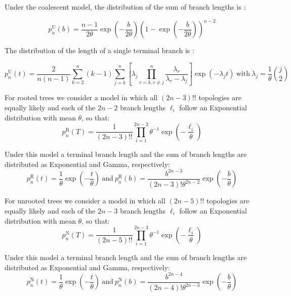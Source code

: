 \documentclass{article}
\begin{document}
Under the coalescent model, the distribution of the sum of branch lengths
is \citep{Tavare1984}: 

\begin{equation}
p_n^\mathrm{U}(b)=\frac{n-1}{2\theta}\exp\left(-\frac{b}{2\theta}\right)\left(1-\exp\left(-\frac{b}{2\theta}\right)\right)^{n-2}
\label{eq:coalescent-sumblen}
\end{equation}

The distribution of the length of a single terminal branch is \citep{caliebeLengthDistributionExternal2007}:

\begin{equation}
p_n^\mathrm{U}(t)=\frac{2}{n(n-1)}\sum_{k=2}^n (k-1) \sum_{j=k}^n \left[\lambda_j \prod_{r=k,r\neq j}^n \frac{\lambda_r}{\lambda_r-\lambda_j}\right]\exp(-\lambda_j t) \mathrm{~with~}\lambda_j=\frac{1}{\theta}{j \choose 2}
\label{eq:coalescent-blen}
\end{equation}

For rooted trees we consider a model in which all $(2n-3)!!$ topologies are equally
likely and each of the $2n-2$ branch lengths $\ell_i$ follow an Exponential distribution with mean $\theta$, so that:
\begin{equation}\label{eq:tree-distrib2}
p_n^\mathrm{R}(T)=\frac{1}{(2n-3)!!}\prod_{i=1}^{2n-2}\theta^{-1}\exp\left(-\frac{\ell_i}{\theta}\right)
\end{equation}

Under this model a terminal branch length and the sum of branch lengths are distributed as
Exponential and Gamma, respectively:
\begin{equation}
p_n^\mathrm{R}(t)=\frac{1}{\theta}\exp\left( -\frac{t}{\theta} \right)
\mathrm{~and~}
p_n^\mathrm{R}(b)=\frac{b^{2n-3}}{(2n-3)!\theta^{2n-2}}  \exp\left(-\frac{b}{\theta} \right)
\label{eq:rooted-blen}
\end{equation}

For unrooted trees we consider a model in which all $(2n-5)!!$ topologies are equally
likely and each of the $2n-3$ branch lengths $\ell_i$ follow an Exponential distribution with mean $\theta$, so that:
\begin{equation}\label{eq:tree-distrib3}
p_n^\mathrm{N}(T)=\frac{1}{(2n-5)!!}\prod_{i=1}^{2n-3}\theta^{-1}\exp\left(-\frac{\ell_i}{\theta}\right)
\end{equation}

Under this model a terminal branch length and the sum of branch lengths are distributed as
Exponential and Gamma, respectively:
\begin{equation}
p_n^\mathrm{N}(t)=\frac{1}{\theta}\exp\left( -\frac{t}{\theta} \right)
\mathrm{~and~}
p_n^\mathrm{N}(b)=\frac{b^{2n-4}}{(2n-4)!\theta^{2n-3}}  \exp\left(-\frac{b}{\theta} \right)
\label{eq:unrooted-blen}
\end{equation}
\end{document}
